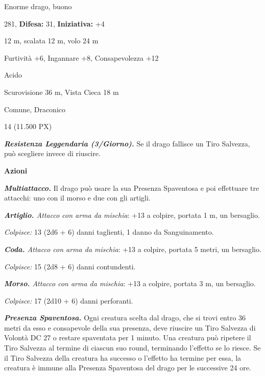 \begin{multicols}{2}
{
\noindent
\begin{description}[noitemsep, topsep=0pt, parsep=0pt, partopsep=0pt, leftmargin=0cm, labelwidth=2.2cm]
	\item[\textbf{Taglia/Tipo:}] Enorme drago, buono
	\item[\textbf{Caratt.:}] 
	\item[\textbf{Punti Ferita:}] 281,  \textbf{Difesa:} 31,  \textbf{Iniziativa:} +4
	\item[\textbf{Movimento:}] 12 m, scalata 12 m, volo 24 m
	\item[\textbf{Tiri Salvez.:}] 
	\item[\textbf{Comp.:}] Furtività +6, Ingannare +8, Consapevolezza +12
	\item[\textbf{Imm. Danni:}] Acido
	\item[\textbf{Sensi:}] Scurovisione 36 m, Vista Cieca 18 m
	\item[\textbf{Linguaggi:}] Comune, Draconico
	\item[\textbf{Sfida:}] 14 (11.500 PX)\smallskip
\end{description}

\emph{\textbf{Resistenza Leggendaria (3/Giorno).}} Se il drago fallisce un Tiro Salvezza, può scegliere invece di riuscire.

\textbf{Azioni}

\emph{\textbf{Multiattacco.}} Il drago può usare la sua Presenza Spaventosa e poi effettuare tre attacchi: uno con il morso e due con gli artigli.

\emph{\textbf{Artiglio.} Attacco con arma da mischia}: +13 a colpire, portata 1 m, un bersaglio.

\emph{Colpisce:} 13 (2d6 + 6) danni taglienti, 1 danno da Sanguinamento.

\emph{\textbf{Coda.} Attacco con arma da mischia}: +13 a colpire, portata 5 metri, un bersaglio.

\emph{Colpisce:} 15 (2d8 + 6) danni contundenti.

\emph{\textbf{Morso.} Attacco con arma da mischia}: +13 a colpire, portata 3 m, un bersaglio.

\emph{Colpisce:} 17 (2d10 + 6) danni perforanti.

\emph{\textbf{Presenza Spaventosa.}} Ogni creatura scelta dal drago, che si trovi entro 36 metri da esso e consapevole della sua presenza, deve riuscire un Tiro Salvezza di Volontà DC 27 o restare spaventata per 1 minuto. Una creatura può ripetere il Tiro Salvezza al termine di ciascun suo round, terminando l'effetto se lo riesce. Se il Tiro Salvezza della creatura ha successo o l'effetto ha termine per essa, la creatura è immune alla Presenza Spaventosa del drago per le successive 24 ore.

}
\end{multicols}
